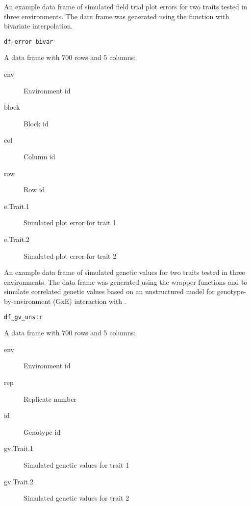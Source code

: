 \documentclass[a4paper]{book}
\begin{document}
%
\begin{Description}\relax
An example data frame of simulated field trial plot errors for two traits
tested in three environments. The data frame was generated using the function
 with bivariate interpolation.
\end{Description}
%
\begin{Usage}
\begin{verbatim}
df_error_bivar
\end{verbatim}
\end{Usage}
%
\begin{Format}
A data frame with 700 rows and 5 columns:
\begin{description}

\item[env] Environment id
\item[block] Block id
\item[col] Column id
\item[row] Row id
\item[e.Trait.1] Simulated plot error for trait 1
\item[e.Trait.2] Simulated plot error for trait 2

\end{description}

\end{Format}
%
\begin{Description}\relax
An example data frame of simulated genetic values for two traits tested in three environments.
The data frame was generated using the wrapper functions  and
 to simulate correlated genetic values based on an
unstructured model for genotype-by-environment (GxE) interaction with
.
\end{Description}
%
\begin{Usage}
\begin{verbatim}
df_gv_unstr
\end{verbatim}
\end{Usage}
%
\begin{Format}
A data frame with 700 rows and 5 columns:
\begin{description}

\item[env] Environment id
\item[rep] Replicate number
\item[id] Genotype id
\item[gv.Trait.1] Simulated genetic values for trait 1
\item[gv.Trait.2] Simulated genetic values for trait 2

\end{description}

\end{Format}
\end{document}
